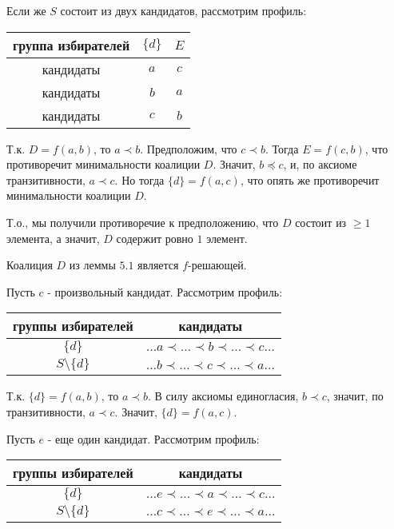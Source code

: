 \begin{Proof}
\begin{Proof}
		Если же $S$ состоит из двух кандидатов, рассмотрим профиль:

		\begin{center}
			\begin{tabular}{ | c | c | c |}
				\hline
					группа избирателей & $\{d\}$ & $E$ \\ \hline
					кандидаты & $a$ & $c$ \\
					кандидаты & $b$ & $a$ \\
					кандидаты & $c$ & $b$ \\
				\hline
			\end{tabular}
		\end{center}

		Т.к. $D = f(a,b)$, то $a \prec b$. Предположим, что $c \prec b$. Тогда $E = f(c, b)$, что противоречит минимальности коалиции $D$. Значит, $b \preceq c$, и, по аксиоме транзитивности, $a \prec c$. Но тогда $\{d\} = f(a,c)$, что опять же противоречит минимальности коалиции $D$.

		Т.о., мы получили противоречие к предположению, что $D$ состоит из $\ge 1$ элемента, а значит, $D$ содержит ровно $1$ элемент.
	\end{Proof}

	\begin{lemma}[]\label{cha:5/lemma:2}
		Коалиция $D$ из леммы $5.1$ является $f$-решающей.
	\end{lemma}
	\begin{Proof}
		Пусть $c$ - произвольный кандидат. Рассмотрим профиль:

		\begin{center}
			\begin{tabular}{ | c | c | }
				\hline
					группы избирателей & кандидаты \\ \hline
					$\{d\}$ & $\dots a \prec \dots \prec b \prec \dots \prec c \dots$ \\
					$S \setminus \{d\}$ & $\dots b \prec \dots \prec c \prec \dots \prec a \dots$ \\
				\hline
			\end{tabular}
		\end{center}

		Т.к. $\{d\} = f(a,b)$, то $a \prec b$. В силу аксиомы единогласия, $b \prec c$, значит, по транзитивности, $a \prec c$. Значит, $\{d\} = f(a, c)$.

		Пусть $e$ - еще один кандидат. Рассмотрим профиль:

		\begin{center}
			\begin{tabular}{ | c | c | }
				\hline
					группы избирателей & кандидаты \\ \hline
					$\{d\}$ & $\dots e \prec \dots \prec a \prec \dots \prec c \dots$ \\
					$S \setminus \{d\}$ & $\dots c \prec \dots \prec e \prec \dots \prec a \dots$ \\
				\hline
			\end{tabular}
		\end{center}


\end{Proof}
\end{Proof}
